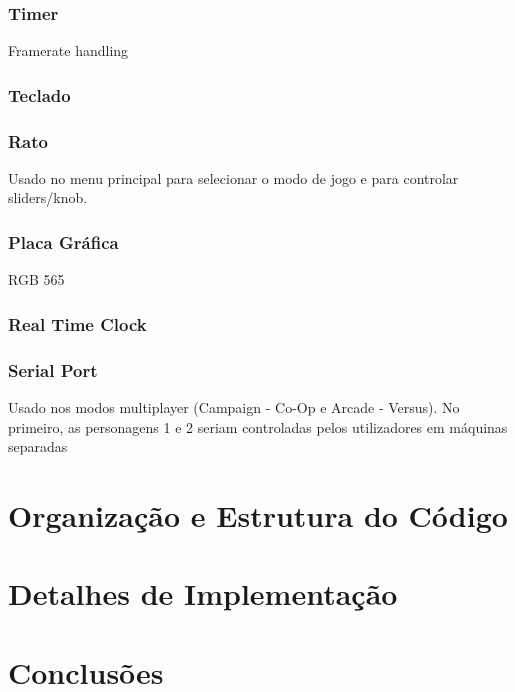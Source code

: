 \documentclass{report}
\begin{document}
\subsection{Timer}

Framerate handling

\subsection{Teclado}

\subsection{Rato}

Usado no menu principal para selecionar o modo de jogo e para controlar sliders/knob.

\subsection{Placa Gráfica}

RGB 565

\subsection{Real Time Clock}

\subsection{Serial Port}

Usado nos modos multiplayer (Campaign - Co-Op e Arcade - Versus). No primeiro, as personagens 1 e 2 seriam controladas pelos utilizadores em máquinas separadas 

\chapter{Organização e Estrutura do Código}

\chapter{Detalhes de Implementação}

\chapter{Conclusões}
\end{document}

